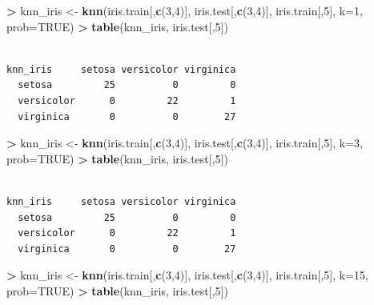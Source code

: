 \documentclass[
]{krantz}
\makeatletter
\newenvironment{Shaded}{\begin{snugshade}}{\end{snugshade}}
\newcommand{\DataTypeTok}[1]{\textcolor[rgb]{0.27,0.27,0.27}{#1}}
\newcommand{\DecValTok}[1]{\textcolor[rgb]{0.06,0.06,0.06}{#1}}
\newcommand{\KeywordTok}[1]{\textcolor[rgb]{0.27,0.27,0.27}{\textbf{#1}}}
\newcommand{\NormalTok}[1]{#1}
\newcommand{\OperatorTok}[1]{\textcolor[rgb]{0.43,0.43,0.43}{\textbf{#1}}}
\newcommand{\OtherTok}[1]{\textcolor[rgb]{0.37,0.37,0.37}{#1}}
\newcommand{\StringTok}[1]{\textcolor[rgb]{0.5,0.5,0.5}{#1}}
\newenvironment{kframe}{%
\medskip{}
\setlength{\fboxsep}{.8em}
 \def\at@end@of@kframe{}%
 \ifinner\ifhmode%
  \def\at@end@of@kframe{\end{minipage}}%
  \begin{minipage}{\columnwidth}%
 \fi\fi%
 \def\FrameCommand##1{\hskip\@totalleftmargin \hskip-\fboxsep
 \colorbox{shadecolor}{##1}\hskip-\fboxsep
     \hskip-\linewidth \hskip-\@totalleftmargin \hskip\columnwidth}%
 \MakeFramed {\advance\hsize-\width
   \@totalleftmargin\z@ \linewidth\hsize
   \@setminipage}}%
 {\par\unskip\endMakeFramed%
 \at@end@of@kframe}
\renewenvironment{Shaded}{\begin{kframe}}{\end{kframe}}
\makeatother
\begin{document}
\begin{Shaded}
\begin{Highlighting}[]
\OperatorTok{\textgreater{}}\StringTok{ }\NormalTok{knn\_iris \textless{}{-}}\StringTok{ }\KeywordTok{knn}\NormalTok{(iris.train[,}\KeywordTok{c}\NormalTok{(}\DecValTok{3}\NormalTok{,}\DecValTok{4}\NormalTok{)], iris.test[,}\KeywordTok{c}\NormalTok{(}\DecValTok{3}\NormalTok{,}\DecValTok{4}\NormalTok{)], iris.train[,}\DecValTok{5}\NormalTok{], }\DataTypeTok{k=}\DecValTok{1}\NormalTok{, }\DataTypeTok{prob=}\OtherTok{TRUE}\NormalTok{)}
\OperatorTok{\textgreater{}}\StringTok{ }\KeywordTok{table}\NormalTok{(knn\_iris, iris.test[,}\DecValTok{5}\NormalTok{])}
\end{Highlighting}
\end{Shaded}

\begin{verbatim}
            
knn_iris     setosa versicolor virginica
  setosa         25          0         0
  versicolor      0         22         1
  virginica       0          0        27
\end{verbatim}

\begin{Shaded}
\begin{Highlighting}[]
\OperatorTok{\textgreater{}}\StringTok{ }\NormalTok{knn\_iris \textless{}{-}}\StringTok{ }\KeywordTok{knn}\NormalTok{(iris.train[,}\KeywordTok{c}\NormalTok{(}\DecValTok{3}\NormalTok{,}\DecValTok{4}\NormalTok{)], iris.test[,}\KeywordTok{c}\NormalTok{(}\DecValTok{3}\NormalTok{,}\DecValTok{4}\NormalTok{)], iris.train[,}\DecValTok{5}\NormalTok{], }\DataTypeTok{k=}\DecValTok{3}\NormalTok{, }\DataTypeTok{prob=}\OtherTok{TRUE}\NormalTok{)}
\OperatorTok{\textgreater{}}\StringTok{ }\KeywordTok{table}\NormalTok{(knn\_iris, iris.test[,}\DecValTok{5}\NormalTok{])}
\end{Highlighting}
\end{Shaded}

\begin{verbatim}
            
knn_iris     setosa versicolor virginica
  setosa         25          0         0
  versicolor      0         22         1
  virginica       0          0        27
\end{verbatim}

\begin{Shaded}
\begin{Highlighting}[]
\OperatorTok{\textgreater{}}\StringTok{ }\NormalTok{knn\_iris \textless{}{-}}\StringTok{ }\KeywordTok{knn}\NormalTok{(iris.train[,}\KeywordTok{c}\NormalTok{(}\DecValTok{3}\NormalTok{,}\DecValTok{4}\NormalTok{)], iris.test[,}\KeywordTok{c}\NormalTok{(}\DecValTok{3}\NormalTok{,}\DecValTok{4}\NormalTok{)], iris.train[,}\DecValTok{5}\NormalTok{], }\DataTypeTok{k=}\DecValTok{15}\NormalTok{, }\DataTypeTok{prob=}\OtherTok{TRUE}\NormalTok{)}
\OperatorTok{\textgreater{}}\StringTok{ }\KeywordTok{table}\NormalTok{(knn\_iris, iris.test[,}\DecValTok{5}\NormalTok{])}
\end{Highlighting}
\end{Shaded}
\end{document}
